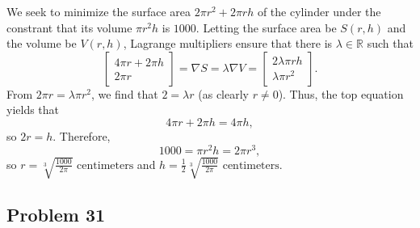 \documentclass[11pt]{article}
\renewcommand{\grad}{\nabla}
\begin{document}
We seek to minimize the surface area $2 \pi r^{2} + 2\pi rh$ of the cylinder under the constrant that its volume $\pi r^{2} h$ is $1000$. Letting the surface area be $S(r, h)$ and the volume be $V(r, h)$, Lagrange multipliers ensure that there is $\lambda \in \mathbb{R}$ such that
\[
	\begin{bmatrix} 4 \pi r + 2\pi h \\ 2\pi r \end{bmatrix} = \grad S = \lambda \grad V = \begin{bmatrix} 2\lambda \pi rh \\ \lambda \pi r^{2} \end{bmatrix}.
\]
From $2\pi r = \lambda \pi r^{2}$, we find that $2 = \lambda r$ (as clearly $r \ne 0$). Thus, the top equation yields that
\[
	4\pi r + 2\pi h = 4 \pi h,
\]
so $2r = h$. Therefore,
\[
	1000 = \pi r^{2} h = 2 \pi r^{3},
\]
so $\boxed{\text{$r = \sqrt[3]{\tfrac{1000}{2\pi}}$ centimeters}}$ and $\boxed{\text{$h = \tfrac{1}{2} \sqrt[3]{\tfrac{1000}{2\pi}}$ centimeters}}$.

\subsection*{Problem 31}
\end{document}

